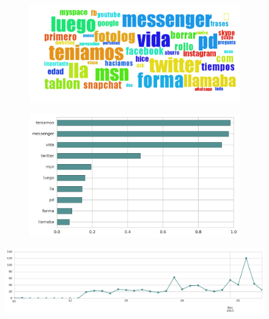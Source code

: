 \begin{figure}[htbp!]
    \centering
    \begin{subfigure}[b]{0.49\textwidth}
        \includegraphics[width=\textwidth]{twitter_all/report_images/topic-27-wordcloud.jpg}
    \end{subfigure}
    \begin{subfigure}[b]{0.49\textwidth}
        \includegraphics[width=\textwidth]{twitter_all/report_images/topic-27-terms.jpg}
    \end{subfigure}
\end{figure}

\begin{figure}[htbp!]
    \centering
    \includegraphics[width=\textwidth]{twitter_all/report_images/topic-27-timeseries.jpg}
\end{figure}

